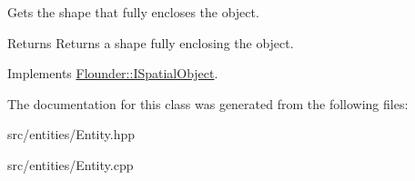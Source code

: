 Gets the shape that fully encloses the object. 

\begin{DoxyReturn}{Returns}
Returns a shape fully enclosing the object. 
\end{DoxyReturn}


Implements \hyperlink{class_flounder_1_1_i_spatial_object_ae1e28211dc94c4229baf284ea10ff556}{Flounder\+::\+I\+Spatial\+Object}.



The documentation for this class was generated from the following files\+:\begin{DoxyCompactItemize}
\item 
src/entities/Entity.\+hpp\item 
src/entities/Entity.\+cpp\end{DoxyCompactItemize}
